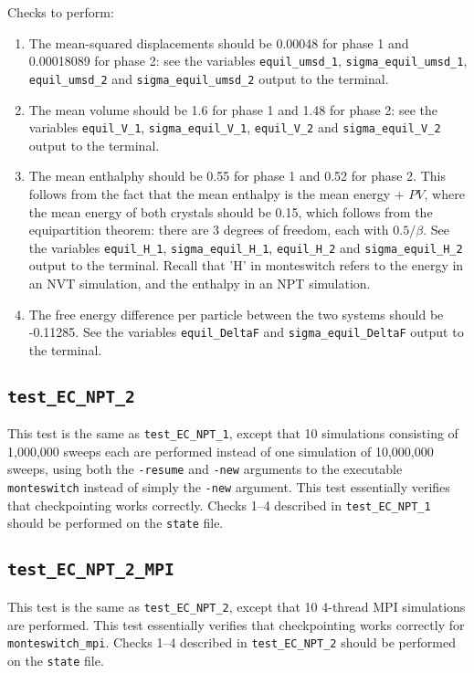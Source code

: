 \documentclass{report}
\begin{document}
Checks to perform:
\begin{enumerate}
\item
The mean-squared displacements should be 0.00048 for phase 1 and 0.00018089 for phase 2: see the 
variables \texttt{equil\_umsd\_1}, \texttt{sigma\_equil\_umsd\_1}, \texttt{equil\_umsd\_2} and \texttt{sigma\_equil\_umsd\_2} output to the 
terminal.
\item
The mean volume should be 1.6 for phase 1 and 1.48 for phase 2: see the variables \texttt{equil\_V\_1}, 
\texttt{sigma\_equil\_V\_1}, \texttt{equil\_V\_2} and \texttt{sigma\_equil\_V\_2} output to the terminal.
\item
The mean enthalphy should be 0.55 for phase 1 and 0.52 for phase 2. This follows from the fact that
the mean enthalpy is the mean energy + $PV$, where the mean energy of both crystals should be 0.15, which 
follows from the equipartition theorem: there are 3 degrees of freedom, each with $0.5/\beta$.
See the variables \texttt{equil\_H\_1}, \texttt{sigma\_equil\_H\_1}, \texttt{equil\_H\_2} and \texttt{sigma\_equil\_H\_2} output to the terminal.
Recall that 'H' in monteswitch refers to the energy in an NVT simulation, and the enthalpy in an NPT simulation.
\item
The free energy difference per particle between the two systems should be -0.11285. See the variables
\texttt{equil\_DeltaF} and \texttt{sigma\_equil\_DeltaF} output to the terminal.
\end{enumerate}


\subsection{\texttt{test\_EC\_NPT\_2}}
This test is the same as \texttt{test\_EC\_NPT\_1}, except that 10 simulations consisting of 1,000,000 sweeps each are performed
instead of one simulation of 10,000,000 sweeps, using both the \texttt{-resume} and \texttt{-new} arguments to the executable 
\texttt{monteswitch} instead of simply the \texttt{-new} argument. This test essentially verifies that checkpointing works
correctly. Checks 1--4 described in \texttt{test\_EC\_NPT\_1} should be performed on the \texttt{state} file.


\subsection{\texttt{test\_EC\_NPT\_2\_MPI}}
This test is the same as \texttt{test\_EC\_NPT\_2}, except that 10 4-thread MPI simulations are performed. This test essentially verifies 
that checkpointing works correctly for \texttt{monteswitch\_mpi}. Checks 1--4 described in \texttt{test\_EC\_NPT\_2} should be 
performed on the \texttt{state} file.
\end{document}
